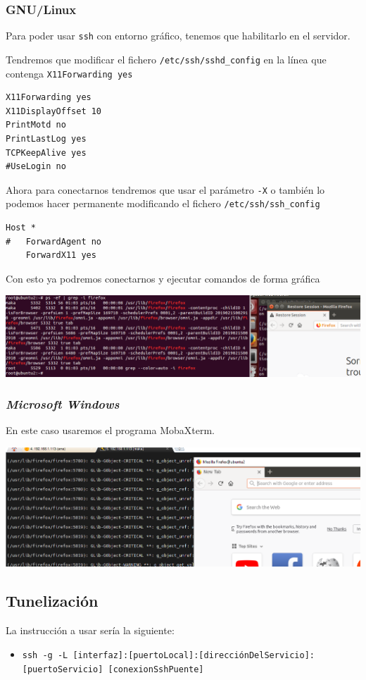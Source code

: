 \documentclass[11pt]{article}
\begin{document}
\subsubsection{GNU/Linux}
\label{sec:orgbc3ad85}
Para poder usar \texttt{ssh} con entorno gráfico, tenemos que habilitarlo en el servidor.

Tendremos que modificar el fichero \texttt{/etc/ssh/sshd\_config} en la línea que contenga \texttt{X11Forwarding yes}
\begin{verbatim}
X11Forwarding yes
X11DisplayOffset 10
PrintMotd no
PrintLastLog yes
TCPKeepAlive yes
#UseLogin no
\end{verbatim}

Ahora para conectarnos tendremos que usar el parámetro \texttt{-X} o también lo podemos hacer permanente modificando el fichero \texttt{/etc/ssh/ssh\_config}
\begin{verbatim}
Host *
#   ForwardAgent no
    ForwardX11 yes
\end{verbatim}

Con esto ya podremos conectarnos y ejecutar comandos de forma gráfica
\begin{center}
\includegraphics[width=.9\linewidth]{./media/x11-1.png}
\end{center}
\subsubsection{\emph{Microsoft Windows}}
\label{sec:orga5e9139}
En este caso usaremos el programa MobaXterm.

\begin{center}
\includegraphics[width=.9\linewidth]{./media/x11-2.png}
\end{center}
\subsection{Tunelización}
\label{sec:orge9bb9f7}
La instrucción a usar sería la siguiente:
\begin{itemize}
\item \texttt{ssh -g -L [interfaz]:[puertoLocal]:[direcciónDelServicio]:[puertoServicio] [conexionSshPuente]}
\end{itemize}
\end{document}
